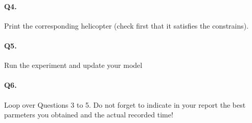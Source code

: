\documentclass[12pt]{scrartcl}
\begin{document}
\paragraph{Q4.} Print the corresponding helicopter (check first that it satisfies the constrains).

\paragraph{Q5.} Run the experiment and update your model

\paragraph{Q6.} Loop over Questions 3 to 5. Do not forget to indicate in your report the best parmeters you obtained and the actual recorded time!
\end{document}
